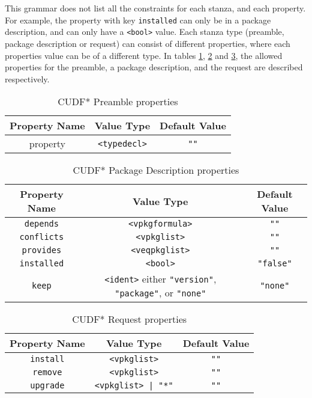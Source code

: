 This grammar does not list all the constraints for each stanza, and each property.
For example, the property with key \verb+installed+ can only be in a package description, and can only have a \verb+<bool>+ value.
Each stanza type (preamble, package description or request) can consist of different properties, where each properties value can be of a different type.
In tables \ref{formal.cudfpremableprops}, \ref{formal.cudfpdprops} and \ref{formal.cudfrequestprops}, 
the allowed properties for the preamble, a package description, and the request are described respectively.

\begin{table}[h]
\begin{tabular}{|c|c|c|}
\hline
Property Name & Value Type & Default Value \\ \hline
property & \verb+<typedecl>+ & \verb+""+ \\\hline
\end{tabular}
\caption{CUDF* Preamble properties}
\label{formal.cudfpremableprops}
\end{table}

\begin{table}[h]
\begin{tabular}{|c|c|c|}
\hline
Property Name & Value Type & Default Value \\ \hline
\texttt{depends} & \texttt{<vpkgformula>} & \verb+""+ \\
\texttt{conflicts} & \texttt{<vpkglist>} & \verb+""+ \\ 
\texttt{provides} & \texttt{<veqpkglist>} & \verb+""+ \\ 
\texttt{installed} & \texttt{<bool>} & \verb+"false"+ \\ 
\texttt{keep} & \texttt{<ident>} either \texttt{"version"}, \texttt{"package"}, or \texttt{"none"} & \texttt{"none"} \\ \hline
\end{tabular}
\caption{CUDF* Package Description properties}
\label{formal.cudfpdprops}
\end{table}

\begin{table}[h]
\begin{tabular}{|c|c|c|}
\hline
Property Name & Value Type & Default Value \\ \hline
\texttt{install} & \verb+<vpkglist>+ & \verb+""+ \\ 
\texttt{remove} & \verb+<vpkglist>+ & \verb+""+ \\ 
\texttt{upgrade} & \verb+<vpkglist> | "*"+ & \verb+""+ \\ \hline
\end{tabular}
\caption{CUDF* Request properties}
\label{formal.cudfrequestprops}
\end{table}

